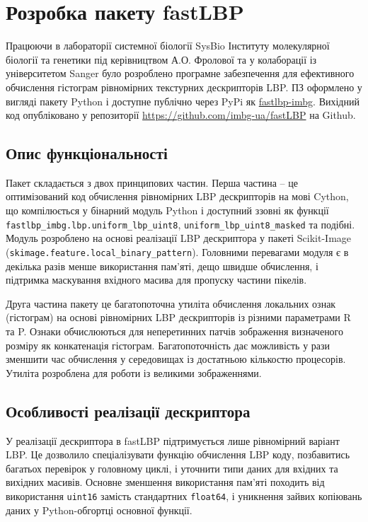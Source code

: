 \section{Розробка пакету fastLBP}\label{section2.2}

Працюючи в лабораторії системної біології SysBio Інституту молекулярної біології та генетики під керівництвом А.О. Фролової 
та у колаборації із університетом Sanger було розроблено програмне забезпечення для ефективного обчислення гістограм 
рівномірних текстурних дескрипторів LBP.
ПЗ оформлено у вигляді пакету Python і доступне публічно через PyPi як \href{https://pypi.org/project/fastlbp-imbg/}{fastlbp-imbg}.
Вихідний код опубліковано у репозиторії \url{https://github.com/imbg-ua/fastLBP} на Github.

\subsection{Опис функціональності}\label{section2.2a}
Пакет складається з двох принципових частин. 
Перша частина -- це оптимізований код обчислення рівномірних LBP дескрипторів на мові Cython, що компілюється у бінарний модуль Python 
і доступний ззовні як функції \verb|fastlbp_imbg.lbp.uniform_lbp_uint8|, \verb|uniform_lbp_uint8_masked| та подібні.
Модуль розроблено на основі реалізації LBP дескриптора у пакеті Scikit-Image (\verb|skimage.feature.local_binary_pattern|).
Головними перевагами модуля є в декілька разів менше використання пам'яті, дещо швидше обчислення, і підтримка маскування вхідного масива для 
пропуску частини пікелів.

Друга частина пакету це багатопоточна утиліта обчислення локальних ознак (гістограм) на основі рівномірних LBP дескрипторів із різними параметрами R та P.
Ознаки обчислюються для неперетинних патчів зображення визначеного розміру як конкатенація гістограм.
Багатопоточність дає можливість у рази зменшити час обчислення у середовищах із достатньою кількостю процесорів.
Утиліта розроблена для роботи із великими зображеннями.

\subsection{Особливості реалізації дескриптора}\label{section2.2b}
У реалізації дескриптора в fastLBP підтримується лише рівномірний варіант LBP.
Це дозволило спеціалізувати функцію обчислення LBP коду, позбавитись багатьох перевірок у головному циклі, і уточнити типи даних для вхідних та вихідних масивів.
Основне зменшення використання пам'яті походить від використання \verb|uint16| замість стандартних \verb|float64|, 
і уникнення зайвих копіювань даних у Python-обгортці основної функції.


